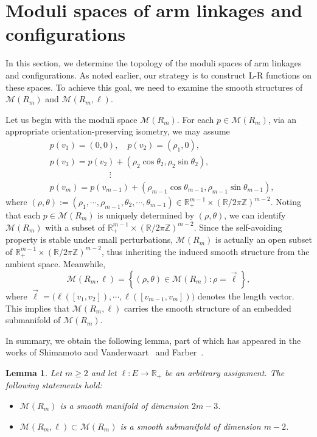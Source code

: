 \documentclass[11pt,letterpaper]{amsart}
\theoremstyle{plain}
\newtheorem{lemma}[theorem]{Lemma}
\theoremstyle{definition}
\theoremstyle{remark}
\numberwithin{equation}{section}
\begin{document}
\section{Moduli spaces of arm linkages and configurations}\label{S-3}
In this section, we determine the topology of the moduli spaces of arm linkages and configurations. As noted earlier, our strategy is to construct L-R functions on these spaces. To achieve this goal, we need to examine the smooth structures of $\mathcal M(R_m)$ and $\mathcal M(R_m,\ell)$.

Let us begin with the moduli space $\mathcal M(R_m)$. For each $p\in \mathcal M(R_m)$, via an appropriate orientation-preserving isometry, we may assume
\[
\begin{aligned}
&p(v_1)=(0,0),\quad p(v_2)=(\rho_1,0),\\
&p(v_3)=p(v_2)+(\rho_2\cos\theta_2,\rho_2\sin\theta_2),\\
&\quad\qquad\qquad\qquad\vdots\\
&p(v_{m})=p(v_{m-1})+(\rho_{m-1}\cos\theta_{m-1},\rho_{m-1}\sin\theta_{m-1}),
\end{aligned}
\]
where $(\rho,\theta)
:=(\rho_1,\cdots,\rho_{m-1},\theta_2,\cdots,\theta_{m-1})\in \mathbb R_{+}^{m-1}\times\left(\mathbb R/2\pi\mathbb Z\right)^{m-2}$.
Noting that each
$p\in \mathcal M(R_m)$ is uniquely determined by $(\rho,\theta)$, we can identify $\mathcal M(R_m)$ with a subset of $\mathbb R_{+}^{m-1}\times\left(\mathbb R/2\pi\mathbb Z\right)^{m-2}$. Since the self-avoiding property is stable under small perturbations,  $\mathcal M(R_m)$ is actually an open subset of
$\mathbb R_{+}^{m-1}\times\left(\mathbb R/2\pi\mathbb Z\right)^{m-2}$, thus inheriting the induced smooth structure from the ambient space. Meanwhile,
\[
\mathcal M(R_m,\ell)=\left\{(\rho,\theta)\in\mathcal M(R_m):\rho=\vec{\ell}\right\},
\]
where $\vec{\ell}=\big(\ell([v_1,v_2]),\cdots,\ell([v_{m-1},v_m])\big)$ denotes the length vector. This implies that $\mathcal M(R_m,\ell)$ carries the smooth structure of an embedded submanifold of $\mathcal M(R_m)$.

In summary, we obtain the following lemma, part of which has appeared in the works of Shimamoto and Vanderwaart~\cite{Shimamoto-2005}
 and Farber~\cite[Chap. 3]{Farber-2008}.
\begin{lemma}\label{L-3-1}
Let $m\geq 2$ and let $\ell:E\to\mathbb R_{+}$ be an arbitrary assignment. The following statements hold:
\begin{itemize}
\item[$(i)$]$\mathcal M(R_m)$ is a smooth manifold of dimension $2m-3$.
\item[$(ii)$]$\mathcal M(R_m,\ell)\subset \mathcal M(R_m)$ is a smooth submanifold of dimension $m-2$.
\end{itemize}
\end{lemma}
\end{document}
